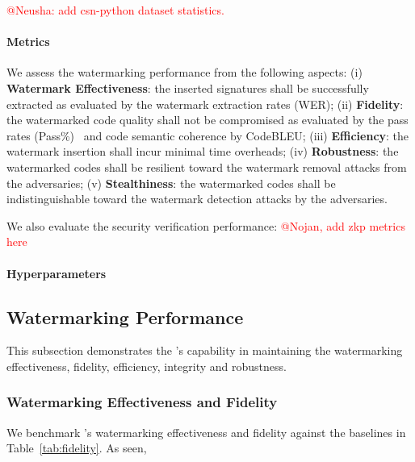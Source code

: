 \textcolor{red}{@Neusha: add csn-python dataset statistics.}



\paragraph{Metrics} We assess the watermarking performance from the following aspects: (i) \textbf{Watermark Effectiveness}: the inserted signatures shall be successfully extracted as evaluated by the watermark extraction rates (WER); (ii) \textbf{Fidelity}: the watermarked code quality shall not be compromised as evaluated by the pass rates (Pass\%)~\cite{chen2021evaluating} and code semantic coherence by CodeBLEU; (iii) \textbf{Efficiency}: the watermark insertion shall incur minimal time overheads; (iv) \textbf{Robustness}: the watermarked codes shall be resilient toward the watermark removal attacks from the adversaries; (v) \textbf{Stealthiness}: the watermarked codes shall be indistinguishable toward the watermark detection attacks by the adversaries. 

We also evaluate the security verification performance: \textcolor{red}{@Nojan, add zkp metrics here}

\paragraph{Hyperparameters} 

\subsection{Watermarking Performance}
This subsection demonstrates the \sys's capability in maintaining the watermarking effectiveness, fidelity, efficiency, integrity and robustness.  

\subsubsection{Watermarking Effectiveness and Fidelity}
We benchmark \sys's watermarking effectiveness and fidelity against the baselines in Table~\ref{tab:fidelity}. As seen,


